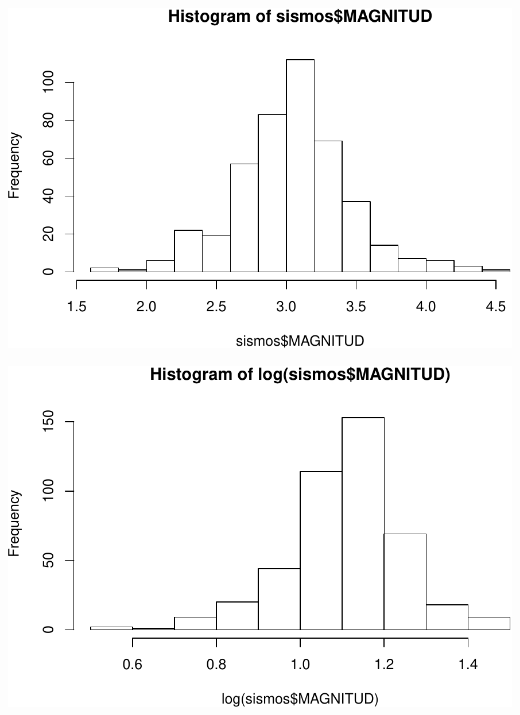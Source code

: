 \documentclass[11pt,]{article}
\newenvironment{Shaded}{\begin{snugshade}}{\end{snugshade}}
\newcommand{\KeywordTok}[1]{\textcolor[rgb]{0.13,0.29,0.53}{\textbf{#1}}}
\newcommand{\OperatorTok}[1]{\textcolor[rgb]{0.81,0.36,0.00}{\textbf{#1}}}
\newcommand{\NormalTok}[1]{#1}
\begin{document}
\includegraphics{proyecto_files/figure-latex/unnamed-chunk-7-1.pdf}

\begin{Shaded}
\end{Shaded}

\includegraphics{proyecto_files/figure-latex/unnamed-chunk-7-2.pdf}

\begin{Shaded}
\end{Shaded}
\end{document}
